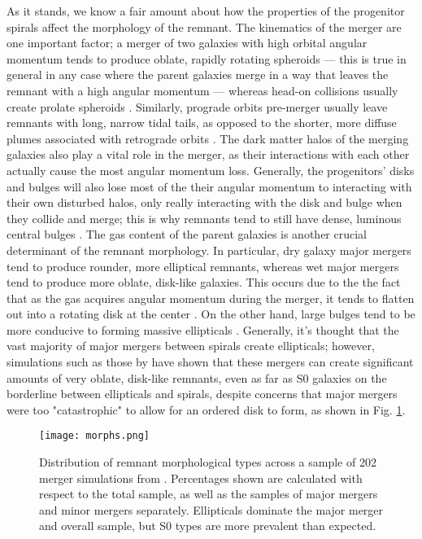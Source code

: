 \documentclass[twocolumn]{aastex631}
\begin{document}
As it stands, we know a fair amount about how the properties of the progenitor spirals affect the morphology of the remnant.
The kinematics of the merger are one important factor; a merger of two galaxies with high orbital angular momentum tends to produce oblate, rapidly rotating spheroids --- this is true in general in any case where the parent galaxies merge in a way that leaves the remnant with a high angular momentum --- whereas head-on collisions usually create prolate spheroids \citep{Barnes+1992}. 
Similarly, prograde orbits pre-merger usually leave remnants with long, narrow tidal tails, as opposed to the shorter, more diffuse plumes associated with retrograde orbits \citep{Duc2013}. 
The dark matter halos of the merging galaxies also play a vital role in the merger, as their interactions with each other actually cause the most angular momentum loss. 
Generally, the progenitors' disks and bulges will also lose most of the their angular momentum to interacting with their own disturbed halos, only really interacting with the disk and bulge when they collide and merge; this is why remnants tend to still have dense, luminous central bulges \citep{Barnes+1992}.
The gas content of the parent galaxies is another crucial determinant of the remnant morphology.
In particular, dry galaxy major mergers tend to produce rounder, more elliptical remnants, whereas wet major mergers tend to produce more oblate, disk-like galaxies.
This occurs due to the the fact that as the gas acquires angular momentum during the merger, it tends to flatten out into a rotating disk at the center \citep{Eliche-Moral+2018}.
On the other hand, large bulges tend to be more conducive to forming massive ellipticals \citep{Barnes+1992}.
Generally, it's thought that the vast majority of major mergers between spirals create ellipticals; however, simulations such as those by \cite{Eliche-Moral+2018} have shown that these mergers can create significant amounts of very oblate, disk-like remnants, even as far as S0 galaxies on the borderline between ellipticals and spirals, despite concerns that major mergers were too "catastrophic" to allow for an ordered disk to form, as shown in Fig. \ref{fig:morphs}.
\begin{figure}
    \centering
    \texttt{[image: morphs.png]}
    \caption{
        Distribution of remnant morphological types across a sample of 202 merger simulations from \cite{Eliche-Moral+2018}.
        Percentages shown are calculated with respect to the total sample, as well as the samples of major mergers and minor mergers separately.
        Ellipticals dominate the major merger and overall sample, but S0 types are more prevalent than expected.
        }
    \label{fig:morphs}
\end{figure}
    
\end{document}

